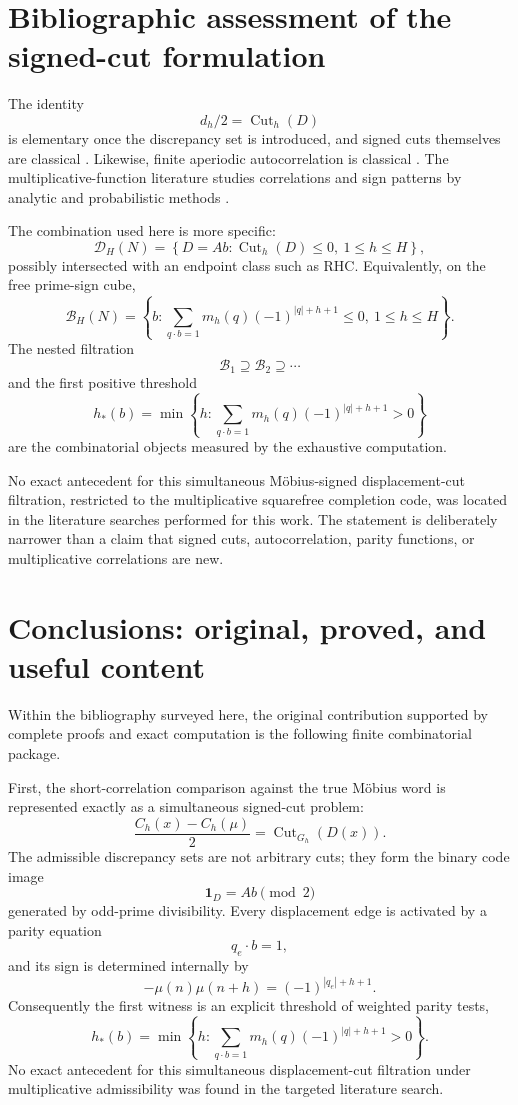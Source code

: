 \documentclass[11pt]{article}
\newcommand{\Cut}{\operatorname{Cut}}
\begin{document}
\section{Bibliographic assessment of the signed-cut formulation}

The identity
\[
 d_h/2=\Cut_h(D)
\]
is elementary once the discrepancy set is introduced, and signed cuts themselves are classical \cite{Zaslavsky1982,Gallier2016}.  Likewise, finite aperiodic autocorrelation is classical \cite{Willms2013}.  The multiplicative-function literature studies correlations and sign patterns by analytic and probabilistic methods \cite{MRT2016,KoukSound2020,AymoneSidoravicius2017}.

The combination used here is more specific:
\[
 \mathcal D_H(N)=
 \left\{
 D=Ab:
 \Cut_h(D)\le0,\ 1\le h\le H
 \right\},
\]
possibly intersected with an endpoint class such as RHC.  Equivalently, on the free prime-sign cube,
\[
 \mathcal B_H(N)=
 \left\{
 b:
 \sum_{q\cdot b=1}
 m_h(q)(-1)^{|q|+h+1}\le0,\
 1\le h\le H
 \right\}.
\]
The nested filtration
\[
 \mathcal B_1\supseteq\mathcal B_2\supseteq\cdots
\]
and the first positive threshold
\[
 h_*(b)=
 \min\left\{
 h:
 \sum_{q\cdot b=1}m_h(q)(-1)^{|q|+h+1}>0
 \right\}
\]
are the combinatorial objects measured by the exhaustive computation.

No exact antecedent for this simultaneous M\"obius-signed displacement-cut filtration, restricted to the multiplicative squarefree completion code, was located in the literature searches performed for this work.  The statement is deliberately narrower than a claim that signed cuts, autocorrelation, parity functions, or multiplicative correlations are new.

\section{Conclusions: original, proved, and useful content}

Within the bibliography surveyed here, the original contribution supported by complete proofs and exact computation is the following finite combinatorial package.

First, the short-correlation comparison against the true M\"obius word is represented exactly as a simultaneous signed-cut problem:
\[
 \boxed{
 \frac{C_h(x)-C_h(\mu)}2
 =\Cut_{G_h}(D(x)).
 }
\]
The admissible discrepancy sets are not arbitrary cuts; they form the binary code image
\[
 \boxed{\mathbf1_D=Ab\pmod2}
\]
generated by odd-prime divisibility.  Every displacement edge is activated by a parity equation
\[
 q_e\cdot b=1,
\]
and its sign is determined internally by
\[
 \boxed{
 -\mu(n)\mu(n+h)=(-1)^{|q_e|+h+1}.
 }
\]
Consequently the first witness is an explicit threshold of weighted parity tests,
\[
 \boxed{
 h_*(b)=
 \min\left\{
 h:
 \sum_{q\cdot b=1}
 m_h(q)(-1)^{|q|+h+1}>0
 \right\}.
 }
\]
No exact antecedent for this simultaneous displacement-cut filtration under multiplicative admissibility was found in the targeted literature search.
\end{document}
